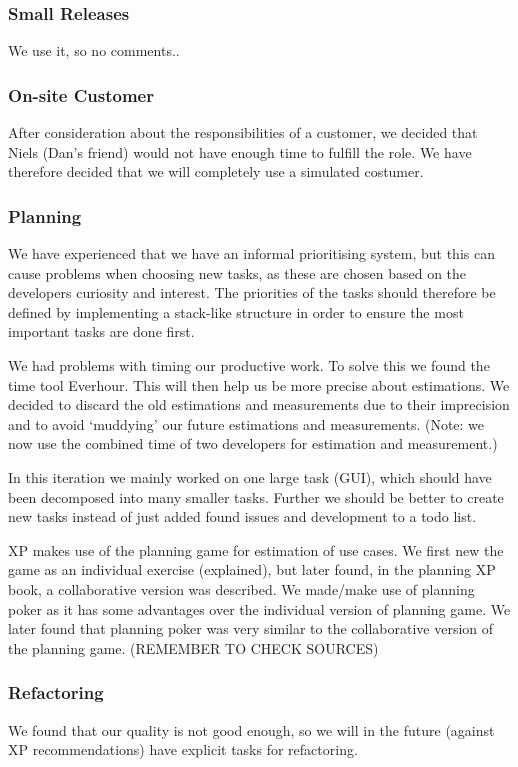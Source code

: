 \subsubsection{Small Releases}
We use it, so no comments..

\subsubsection{On-site Customer}
After consideration about the responsibilities of a customer, we decided that Niels (Dan’s friend) would not have enough time to fulfill the role.
We have therefore decided that we will completely use a simulated costumer.

\subsubsection{Planning}
We have experienced that we have an informal prioritising system, but this can cause problems when choosing new tasks, as these are chosen based on the developers curiosity and interest. The priorities of the tasks should therefore be defined by implementing a stack-like structure in order to ensure the most important tasks are done first.

We had problems with timing our productive work. To solve this we found the time tool Everhour.
This will then help us be more precise about estimations.
We decided to discard the old estimations and measurements due to their imprecision and to avoid `muddying' our future estimations and measurements. (Note: we now use the combined time of two developers for estimation and measurement.)

In this iteration we mainly worked on one large task (GUI), which should have been decomposed into many smaller tasks. Further we should be better to create new tasks instead of just added found issues and development to a todo list.

XP makes use of the planning game for estimation of use cases. We first new the game as an individual exercise (explained), but later found, in the planning XP book, a collaborative version was described. We made/make use of planning poker as it has some advantages over the individual version of planning game. We later found that planning poker was very similar to the collaborative version of the planning game. (REMEMBER TO CHECK SOURCES) 

\subsubsection{Refactoring}
We found that our quality is not good enough, so we will in the future (against XP recommendations) have explicit tasks for refactoring.

